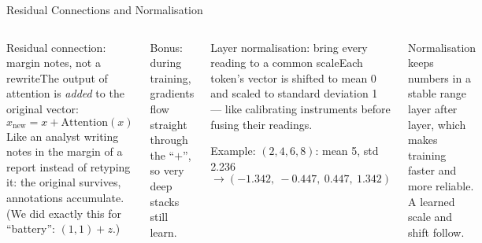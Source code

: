 \documentclass[aspectratio=169,10pt]{beamer}
\begin{document}
\begin{frame}{Residual Connections and Normalisation}
\begin{columns}[T]
\begin{cbox}{Residual connection: margin notes, not a rewrite}\scriptsize The output of attention is \emph{added} to the original vector:
\[x_{\text{new}}=x+\text{Attention}(x)\]
Like an analyst writing notes in the margin of a report instead of retyping it: the original survives, annotations accumulate. (We did exactly this for ``battery'': $(1,1)+z$.)\end{cbox}
\begin{rbox}\scriptsize Bonus: during training, gradients flow straight through the ``$+$'', so very deep stacks still learn.\end{rbox}
\begin{cbox}{Layer normalisation: bring every reading to a common scale}\scriptsize Each token's vector is shifted to mean 0 and scaled to standard deviation 1 --- like calibrating instruments before fusing their readings.
\vspace{2pt}

Example: $(2,4,6,8)$: mean 5, std 2.236
\[\to(-1.342,\ -0.447,\ 0.447,\ 1.342)\]
\end{cbox}
\begin{ibox}\scriptsize Normalisation keeps numbers in a stable range layer after layer, which makes training faster and more reliable. A learned scale and shift follow.\end{ibox}
\end{columns}
\end{frame}
\end{document}
